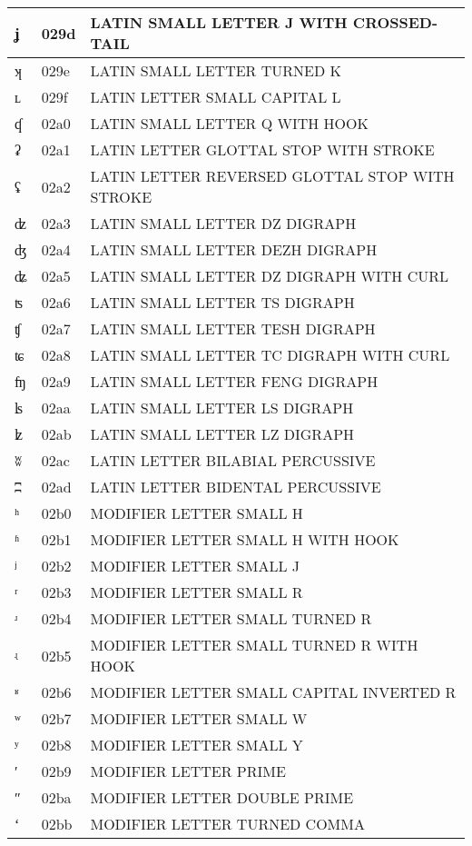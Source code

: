 \documentclass[12pt,letterpaper,openany]{book}
\begin{document}
\begin{center}
\begin{supertabular}{|m{0.25in}|m{0.5in}|m{4in}|}
ʝ & 029d & LATIN SMALL LETTER J WITH CROSSED-TAIL\\\hline
ʞ & 029e & LATIN SMALL LETTER TURNED K\\\hline
ʟ & 029f & LATIN LETTER SMALL CAPITAL L\\\hline
ʠ & 02a0 & LATIN SMALL LETTER Q WITH HOOK\\\hline
ʡ & 02a1 & LATIN LETTER GLOTTAL STOP WITH STROKE\\\hline
ʢ & 02a2 & LATIN LETTER REVERSED GLOTTAL STOP WITH STROKE\\\hline
ʣ & 02a3 & LATIN SMALL LETTER DZ DIGRAPH\\\hline
ʤ & 02a4 & LATIN SMALL LETTER DEZH DIGRAPH\\\hline
ʥ & 02a5 & LATIN SMALL LETTER DZ DIGRAPH WITH CURL\\\hline
ʦ & 02a6 & LATIN SMALL LETTER TS DIGRAPH\\\hline
ʧ & 02a7 & LATIN SMALL LETTER TESH DIGRAPH\\\hline
ʨ & 02a8 & LATIN SMALL LETTER TC DIGRAPH WITH CURL\\\hline
ʩ & 02a9 & LATIN SMALL LETTER FENG DIGRAPH\\\hline
ʪ & 02aa & LATIN SMALL LETTER LS DIGRAPH\\\hline
ʫ & 02ab & LATIN SMALL LETTER LZ DIGRAPH\\\hline
ʬ & 02ac & LATIN LETTER BILABIAL PERCUSSIVE\\\hline
ʭ & 02ad & LATIN LETTER BIDENTAL PERCUSSIVE\\\hline
ʰ & 02b0 & MODIFIER LETTER SMALL H\\\hline
ʱ & 02b1 & MODIFIER LETTER SMALL H WITH HOOK\\\hline
ʲ & 02b2 & MODIFIER LETTER SMALL J\\\hline
ʳ & 02b3 & MODIFIER LETTER SMALL R\\\hline
ʴ & 02b4 & MODIFIER LETTER SMALL TURNED R\\\hline
ʵ & 02b5 & MODIFIER LETTER SMALL TURNED R WITH HOOK\\\hline
ʶ & 02b6 & MODIFIER LETTER SMALL CAPITAL INVERTED R\\\hline
ʷ & 02b7 & MODIFIER LETTER SMALL W\\\hline
ʸ & 02b8 & MODIFIER LETTER SMALL Y\\\hline
ʹ & 02b9 & MODIFIER LETTER PRIME\\\hline
ʺ & 02ba & MODIFIER LETTER DOUBLE PRIME\\\hline
ʻ & 02bb & MODIFIER LETTER TURNED COMMA\\\hline

\end{supertabular}
\end{center}
\end{document}
